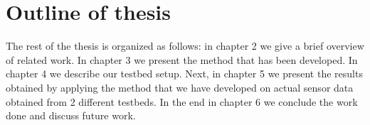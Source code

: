 \section{Outline of thesis}

The rest of the thesis is organized as follows: in chapter 2 we give a brief overview of related work. In chapter 3 we present the method that has been developed. In chapter 4 we describe our testbed setup. Next, in chapter 5 we present the results obtained by applying the method that we have developed on actual sensor data obtained from 2 different testbeds. In the end in chapter 6 we conclude the work done and discuss future work.






\vspace{1\baselineskip}

\noindent

